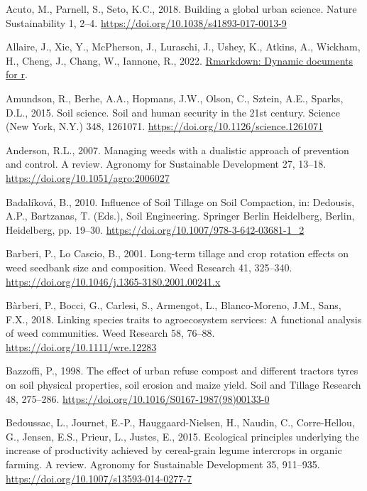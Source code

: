 \documentclass[
  12pt,
]{article}
\newlength{\cslhangindent}
\newlength{\cslentryspacingunit} %
\newenvironment{CSLReferences}[2] %
 {%
  \setlength{\parindent}{0pt}
  \ifodd #1
  \let\oldpar\par
  \def\par{\hangindent=\cslhangindent\oldpar}
  \fi
  \setlength{\parskip}{#2\cslentryspacingunit}
 }%
 {}
\begin{document}
\hypertarget{refs}{}
\begin{CSLReferences}{1}{0}
\leavevmode{}%
Acuto, M., Parnell, S., Seto, K.C., 2018. Building a global urban science. Nature Sustainability 1, 2--4. \url{https://doi.org/10.1038/s41893-017-0013-9}

\leavevmode{}%
Allaire, J., Xie, Y., McPherson, J., Luraschi, J., Ushey, K., Atkins, A., Wickham, H., Cheng, J., Chang, W., Iannone, R., 2022. \href{https://github.com/rstudio/rmarkdown}{Rmarkdown: Dynamic documents for r}.

\leavevmode{}%
Amundson, R., Berhe, A.A., Hopmans, J.W., Olson, C., Sztein, A.E., Sparks, D.L., 2015. Soil science. {Soil} and human security in the 21st century. Science (New York, N.Y.) 348, 1261071. \url{https://doi.org/10.1126/science.1261071}

\leavevmode{}%
Anderson, R.L., 2007. Managing weeds with a dualistic approach of prevention and control. {A} review. Agronomy for Sustainable Development 27, 13--18. \url{https://doi.org/10.1051/agro:2006027}

\leavevmode{}%
Badalíková, B., 2010. Influence of {Soil Tillage} on {Soil Compaction}, in: Dedousis, A.P., Bartzanas, T. (Eds.), Soil {Engineering}. {Springer Berlin Heidelberg}, {Berlin, Heidelberg}, pp. 19--30. \url{https://doi.org/10.1007/978-3-642-03681-1_2}

\leavevmode{}%
Barberi, P., Lo Cascio, B., 2001. Long-term tillage and crop rotation effects on weed seedbank size and composition. Weed Research 41, 325--340. \url{https://doi.org/10.1046/j.1365-3180.2001.00241.x}

\leavevmode{}%
Bàrberi, P., Bocci, G., Carlesi, S., Armengot, L., Blanco-Moreno, J.M., Sans, F.X., 2018. Linking species traits to agroecosystem services: A functional analysis of weed communities. Weed Research 58, 76--88. \url{https://doi.org/10.1111/wre.12283}

\leavevmode{}%
Bazzoffi, P., 1998. The effect of urban refuse compost and different tractors tyres on soil physical properties, soil erosion and maize yield. Soil and Tillage Research 48, 275--286. \url{https://doi.org/10.1016/S0167-1987(98)00133-0}

\leavevmode{}%
Bedoussac, L., Journet, E.-P., Hauggaard-Nielsen, H., Naudin, C., Corre-Hellou, G., Jensen, E.S., Prieur, L., Justes, E., 2015. Ecological principles underlying the increase of productivity achieved by cereal-grain legume intercrops in organic farming. {A} review. Agronomy for Sustainable Development 35, 911--935. \url{https://doi.org/10.1007/s13593-014-0277-7}


\end{CSLReferences}
\end{document}
